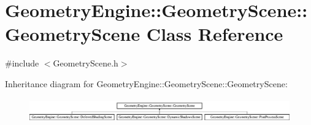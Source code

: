\hypertarget{class_geometry_engine_1_1_geometry_scene_1_1_geometry_scene}{}\section{Geometry\+Engine\+::Geometry\+Scene\+::Geometry\+Scene Class Reference}
\label{class_geometry_engine_1_1_geometry_scene_1_1_geometry_scene}


{\ttfamily \#include $<$Geometry\+Scene.\+h$>$}

Inheritance diagram for Geometry\+Engine\+::Geometry\+Scene\+::Geometry\+Scene\+:\begin{figure}[H]
\begin{center}
\leavevmode
\includegraphics[height=1.063628cm]{class_geometry_engine_1_1_geometry_scene_1_1_geometry_scene}
\end{center}
\end{figure}
